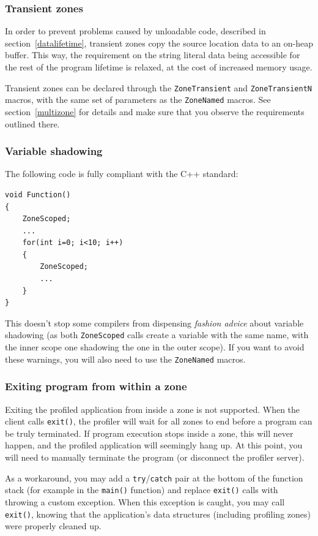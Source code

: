 \documentclass[hidelinks,titlepage,a4paper]{article}
\begin{document}
\subsubsection{Transient zones}
\label{transientzones}

In order to prevent problems caused by unloadable code, described in section~\ref{datalifetime}, transient zones copy the source location data to an on-heap buffer. This way, the requirement on the string literal data being accessible for the rest of the program lifetime is relaxed, at the cost of increased memory usage.

Transient zones can be declared through the \texttt{ZoneTransient} and \texttt{ZoneTransientN} macros, with the same set of parameters as the \texttt{ZoneNamed} macros. See section~\ref{multizone} for details and make sure that you observe the requirements outlined there.

\subsubsection{Variable shadowing}

The following code is fully compliant with the C++ standard:

\begin{lstlisting}
void Function()
{
	ZoneScoped;
	...
	for(int i=0; i<10; i++)
	{
		ZoneScoped;
		...
	}
}
\end{lstlisting}

This doesn't stop some compilers from dispensing \emph{fashion advice} about variable shadowing (as both \texttt{ZoneScoped} calls create a variable with the same name, with the inner scope one shadowing the one in the outer scope). If you want to avoid these warnings, you will also need to use the \texttt{ZoneNamed} macros.

\subsubsection{Exiting program from within a zone}

Exiting the profiled application from inside a zone is not supported. When the client calls \texttt{exit()}, the profiler will wait for all zones to end before a program can be truly terminated. If program execution stops inside a zone, this will never happen, and the profiled application will seemingly hang up. At this point, you will need to manually terminate the program (or disconnect the profiler server).

As a workaround, you may add a \texttt{try}/\texttt{catch} pair at the bottom of the function stack (for example in the \texttt{main()} function) and replace \texttt{exit()} calls with throwing a custom exception. When this exception is caught, you may call \texttt{exit()}, knowing that the application's data structures (including profiling zones) were properly cleaned up.
\end{document}
